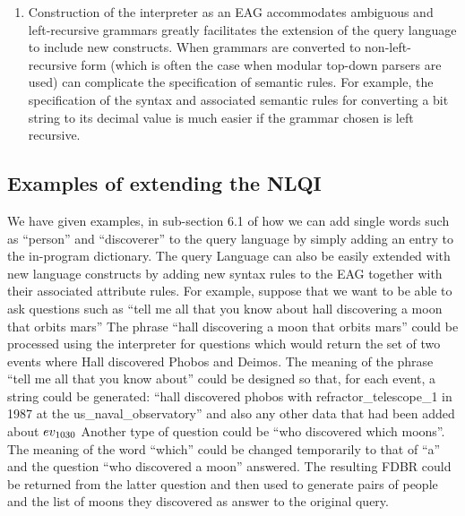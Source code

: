 \documentclass[../main.tex]{subfiles}
\begin{document}
\begin{refsection}
\begin{enumerate}
	\item Construction of the interpreter as an EAG accommodates ambiguous and left-recursive
	grammars greatly facilitates the extension of the query language to include new
	constructs. When grammars are converted to non-left-recursive
	form (which is often the case when modular top-down parsers are used) can complicate the
	specification of semantic rules. For example, the specification of the syntax and associated
	semantic rules for converting a bit string to its decimal value is much easier if the grammar
	chosen is left recursive.
\end{enumerate}

\subsection{Examples of extending the NLQI}

We have given examples, in sub-section 6.1 of how we can add single words such as ``person'' and
``discoverer'' to the query language by simply adding an entry to the in-program dictionary.
The query Language can also be easily extended with new language constructs by adding new syntax
rules to the EAG together with their associated attribute rules. For example, suppose that we want to be able to ask questions such as ``tell me all that you
know about hall discovering a moon that orbits mars'' The phrase ``hall discovering a moon that orbits
mars'' could be processed using the interpreter for questions which would return the set of two events
where Hall discovered Phobos and Deimos. The meaning of the phrase ``tell me all that
you know about'' could be designed so that, for each event, a string could be generated: ``hall discovered phobos with refractor\_telescope\_1 in 1987 at the us\_naval\_observatory''
and also any other data that had been added about $ev_{\mathrm{1030}}$
Another type of question could be ``who discovered which moons''. The meaning of the word ``which''
could be changed temporarily to that of ``a'' and the question ``who discovered a moon'' answered. The
resulting FDBR could be returned from the latter question and then used to generate pairs of people and
the list of moons they discovered as answer to the original query.


\end{refsection}
\end{document}
